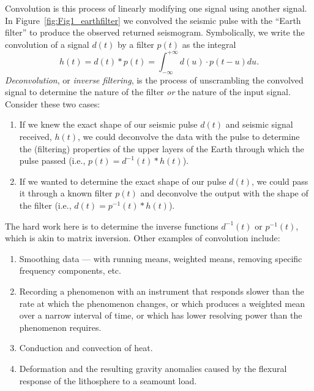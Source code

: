 
Convolution is this process of linearly modifying one signal using another signal.  In Figure~\ref{fig:Fig1_earthfilter} we 
convolved the seismic pulse with the ``Earth filter'' to produce the observed returned seismogram.  
Symbolically, we write the convolution of a signal $d(t)$ by a filter $p(t)$ as the integral
\begin{equation}
h(t) = d(t) * p(t) = \int_{-\infty}^{+\infty} d(u) \cdot p(t-u) du.
\label{eq:convolution}
\end{equation}
\emph{Deconvolution}, or \emph{inverse filtering}, is the process of unscrambling the convolved signal to 
determine the nature of the filter \emph{or} the nature of the input signal.  Consider these two cases:
\begin{enumerate}
\item If we knew the exact shape of our seismic pulse $d(t)$ and seismic signal received, $h(t)$, we could 
deconvolve the data with the pulse to determine the (filtering) properties of the upper layers of the Earth through 
which the pulse passed (i.e., $p(t) = d^{-1}(t) * h(t)$).
\item If we wanted to determine the exact shape of our pulse $d(t)$, we could pass it through a known 
filter $p(t)$ and deconvolve the output with the shape of the filter (i.e., $d(t) = p^{-1}(t) * h(t)$).
\end{enumerate}
The hard work here is to determine the inverse functions $d^{-1}(t)$ or $p^{-1}(t)$, which is akin to matrix inversion.
Other examples of convolution include:
\begin{enumerate}
\item Smoothing data --- with running means, weighted means, removing specific frequency components, 
etc.
 \item Recording a phenomenon with an instrument that responds slower than the rate at which the 
phenomenon changes, or which produces a weighted mean over a narrow interval of time,
or which has lower resolving power than the phenomenon requires.
\item Conduction and convection of heat.
\item Deformation and the resulting gravity anomalies caused by the flexural response of the lithosphere
to a seamount load.
\end{enumerate}

